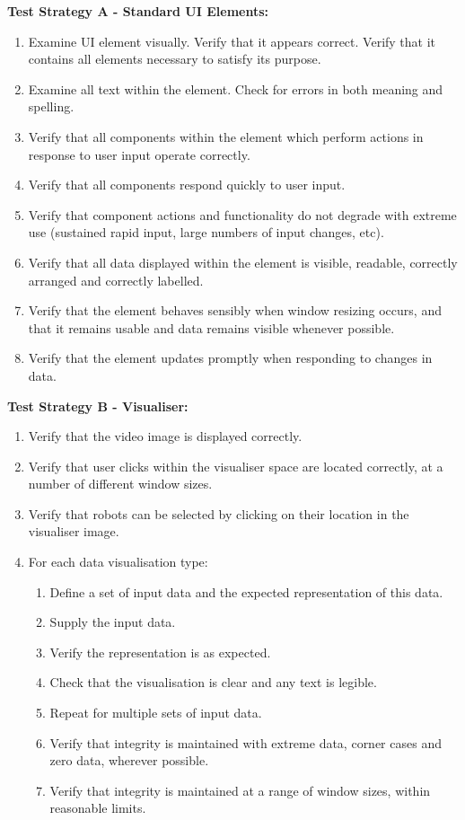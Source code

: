 \textbf{Test Strategy A - Standard UI Elements:}

\begin{enumerate}
 \item Examine UI element visually. Verify that it appears correct. Verify that it contains all elements necessary to satisfy its purpose.
 \item Examine all text within the element. Check for errors in both meaning and spelling.
 \item Verify that all components within the element which perform actions in response to user input operate correctly.
 \item Verify that all components respond quickly to user input.
 \item Verify that component actions and functionality do not degrade with extreme use (sustained rapid input, large numbers of input changes, etc).
 \item Verify that all data displayed within the element is visible, readable, correctly arranged and correctly labelled.
 \item Verify that the element behaves sensibly when window resizing occurs, and that it remains usable and data remains visible whenever possible.
 \item Verify that the element updates promptly when responding to changes in data.
\end{enumerate}

\textbf{Test Strategy B - Visualiser:}

\begin{enumerate}
 \item Verify that the video image is displayed correctly.
 \item Verify that user clicks within the visualiser space are located correctly, at a number of different window sizes.
 \item Verify that robots can be selected by clicking on their location in the visualiser image.
 \item For each data visualisation type:
 \begin{enumerate}
  \item Define a set of input data and the expected representation of this data.
  \item Supply the input data.
  \item Verify the representation is as expected.
  \item Check that the visualisation is clear and any text is legible.
  \item Repeat for multiple sets of input data.
  \item Verify that integrity is maintained with extreme data, corner cases and zero data, wherever possible.
  \item Verify that integrity is maintained at a range of window sizes, within reasonable limits.
 \end{enumerate}
\end{enumerate}

